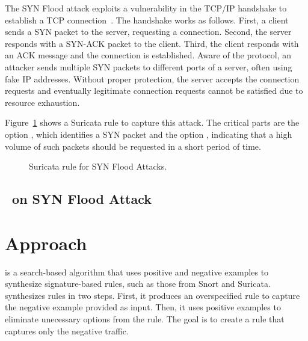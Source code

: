 \documentclass[conference]{IEEEtran}
\begin{document}
The SYN Flood attack exploits a vulnerability in the TCP/IP handshake
to establish a TCP connection~\cite{cloudfare-synflood}. The handshake
works as follows. First, a client sends a SYN packet to the server,
requesting a connection. Second, the server responds with a SYN-ACK
packet to the client. Third, the client responds with an ACK message
and the connection is established. Aware of the protocol, an attacker
sends multiple SYN packets to different ports of a server, often using
fake IP addresses. Without proper protection, the server accepts the
connection requests and eventually legitimate connection requests
cannot be satisfied due to resource exhaustion.

Figure~\ref{fig:synflood-example} shows a Suricata rule to capture
this attack. The critical parts are the option ,
which identifies a SYN packet and the option , indicating that a high
volume of such packets should be requested in a short period of time.

\begin{figure}[t]
  
  \caption{Suricata rule for SYN Flood Attacks.}
  \label{fig:synflood-example}
\end{figure}

\subsection{\tname\ on SYN Flood Attack}


\section{Approach}

\tname{} is a search-based algorithm that uses positive and negative
examples to synthesize signature-based rules, such as those from Snort
and Suricata. \tname{} synthesizes rules in two steps. First, it
produces an overspecified rule to capture the negative example
provided as input. Then, it uses positive examples to eliminate
unecessary options from the rule. The goal is to create a rule that
captures only the negative traffic.
\end{document}
